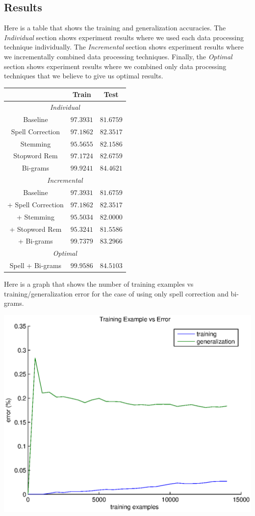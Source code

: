 \subsection*{Results}

Here is a table that shows the training and generalization accuracies.
The \emph{Individual} section shows experiment results where we used
each data processing technique individually. The \emph{Incremental}
section shows experiment results where we incrementally combined data
processing techniques. Finally, the \emph{Optimal} section shows experiment
results where we combined only data processing techniques that we
believe to give us optimal results.

\begin{center}
\begin{tabular}{|c|c|c|}
\hline 
 & Train & Test\tabularnewline
\hline 
\multicolumn{3}{|c}{\emph{Individual}}\tabularnewline
\hline 
\hline 
Baseline & $97.3931$ & $81.6759$\tabularnewline
\hline 
Spell Correction & $97.1862$ & $82.3517$\tabularnewline
\hline 
Stemming & $95.5655$ & $82.1586$\tabularnewline
\hline 
Stopword Rem & $97.1724$ & $82.6759$\tabularnewline
\hline 
Bi-grams & $99.9241$ & $84.4621$\tabularnewline
\hline 
\multicolumn{3}{|c|}{\emph{Incremental}}\tabularnewline
\hline 
\hline 
Baseline & $97.3931$ & $81.6759$\tabularnewline
\hline 
+ Spell Correction & $97.1862$ & $82.3517$\tabularnewline
\hline 
+ Stemming & $95.5034$ & $82.0000$\tabularnewline
\hline 
+ Stopword Rem & $95.3241$ & $81.5586$\tabularnewline
\hline 
+ Bi-grams & $99.7379$ & $83.2966$\tabularnewline
\hline 
\multicolumn{3}{|c|}{\emph{Optimal}}\tabularnewline
\hline 
\hline 
Spell + Bi-grams & $99.9586$ & $84.5103$\tabularnewline
\hline 
\end{tabular}
\par\end{center}

Here is a graph that shows the number of training examples vs training/generalization
error for the case of using only spell correction and bi-grams.

\begin{center}
\includegraphics[scale=0.5]{logit-spell-bigram-error}
\par\end{center}


